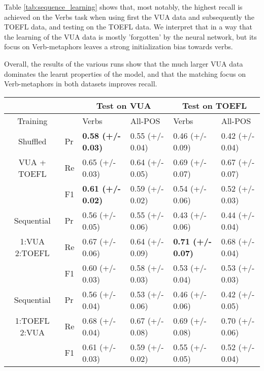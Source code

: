 \documentclass[11pt,a4paper]{article}
\begin{document}
Table \ref{tab:sequence_learning} shows that, most notably, the highest recall is achieved on the Verbs task when using first the VUA data and subsequently the TOEFL data, and testing on the TOEFL data. We interpret that in a way that the learning of the VUA data is mostly 'forgotten' by the neural network, but its focus on Verb-metaphors leaves a strong initialization bias towards verbs. 

Overall, the results of the various runs show that the much larger VUA data dominates the learnt properties of the model, and that the matching focus on Verb-metaphors in both datasets improves recall.  

\begin{table*}[tb!]
\begin{center}
\begin{tabular}{lll||l|l||l|l|}
\hline 
\multicolumn{2}{|c|}{}  &  & \multicolumn{2}{|c||}{Test on VUA} & \multicolumn{2}{c|}{Test on TOEFL} \\  
\hline 
\multicolumn{2}{|c|}{Training} &    & Verbs   & All-POS       & Verbs      & All-POS    \\ \hline \hline
%
\multicolumn{2}{|c|}{Shuffled}      & Pr    & \textbf{0.58 (+/- 0.03)}  & 0.55 (+/- 0.04) & 0.46 (+/- 0.09) & 0.42 (+/- 0.04) \\ \cline{3-7}
\multicolumn{2}{|c|}{VUA + TOEFL}   & Re    & 0.65 (+/- 0.03)  & 0.64 (+/- 0.05) & 0.69 (+/- 0.07) & 0.67 (+/- 0.07) \\ \cline{3-7} 
\multicolumn{2}{|l|}{}              & F1    & \textbf{0.61 (+/- 0.02)}  & 0.59 (+/- 0.02) & 0.54 (+/- 0.06) & 0.52 (+/- 0.03) \\ 
\hline  \hline
%
\multicolumn{2}{|c|}{Sequential}    & Pr    & 0.56 (+/- 0.05) & 0.55 (+/- 0.06)  & 0.43 (+/- 0.06) & 0.44 (+/- 0.04) \\ \cline{3-7} 
\multicolumn{2}{|c|}{1:VUA 2:TOEFL} & Re    & 0.67 (+/- 0.06) & 0.64 (+/- 0.09)  & \textbf{0.71 (+/- 0.07)} & 0.68 (+/- 0.04) \\ \cline{3-7} 
\multicolumn{2}{|l|}{}              & F1    & 0.60 (+/- 0.03) & 0.58 (+/- 0.03)  & 0.53 (+/- 0.04) & 0.53 (+/- 0.03) \\ 
\hline \hline
%
\multicolumn{2}{|c|}{Sequential}    & Pr    &  0.56 (+/- 0.04) & 0.53 (+/- 0.06) & 0.46 (+/- 0.06) & 0.42 (+/- 0.05) \\ \cline{3-7}
\multicolumn{2}{|c|}{1:TOEFL 2:VUA} & Re    &  0.68 (+/- 0.04) & 0.67 (+/- 0.08) & 0.69 (+/- 0.08) & 0.70 (+/- 0.06) \\ \cline{3-7} 
\multicolumn{2}{|l|}{}              & F1    &  0.61 (+/- 0.03) & 0.59 (+/- 0.02) & 0.55 (+/- 0.05) & 0.52 (+/- 0.04) \\ 

\end{tabular}
\end{center}
\end{table*}
\end{document}
